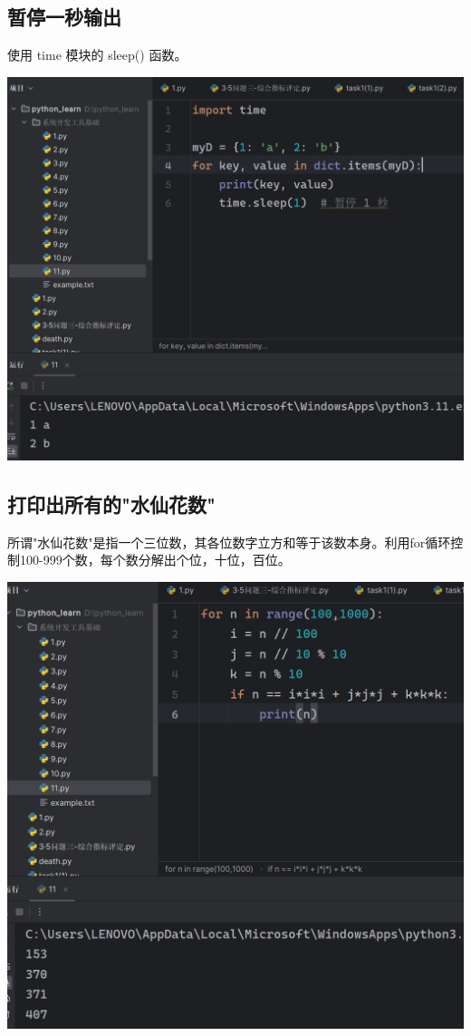 \documentclass[UTF8,a4paper]{ctexart}
\begin{document}
\begin{sloppypar}
	\subsection{暂停一秒输出}
	使用 time 模块的 sleep() 函数。
	
	
	\includegraphics[width = 14cm]{24}
	
	\subsection{打印出所有的"水仙花数"}
	所谓"水仙花数"是指一个三位数，其各位数字立方和等于该数本身。利用for循环控制100-999个数，每个数分解出个位，十位，百位。
	
	\includegraphics[width = 14cm]{25}
	

\end{sloppypar}
\end{document}
